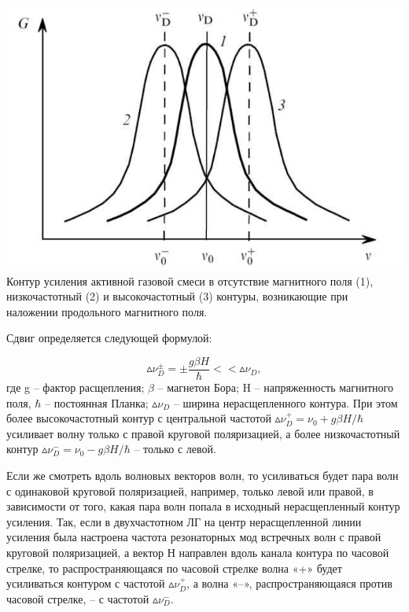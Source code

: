 \documentclass[a4paper,12pt]{article} %
\begin{document}
\begin{center}
    \includegraphics[scale=0.7]{pic8}\\
    \caption{Контур усиления активной газовой смеси в отсутствие магнитного
поля (1), низкочастотный (2) и высокочастотный (3) контуры, возникающие
при наложении продольного магнитного поля.}
\end{center}

Сдвиг определяется следующей формулой:

\begin{equation*}
    \vartriangle \! \! \nu^\pm_D = \pm \frac{g \beta H} {\hbar} << \vartriangle 
    \!\! \nu_D,
\end{equation*}
где g -- фактор расщепления; $\beta$ -- магнетон Бора; H -- напряженность магнитного поля, $\hbar$ -- постоянная Планка; $\vartriangle \! \! \nu_D$ -- ширина нерасщепленного контура. При этом более высокочастотный контур с центральной частотой $\vartriangle \! \! \nu^+_D = \nu_0 + g \beta H / \hbar$ усиливает волну только с правой круговой поляризацией, а более низкочастотный контур $\vartriangle \! \! \nu^-_D = \nu_0 - g \beta H / \hbar$ -- только с левой.

Если же смотреть вдоль волновых векторов волн, то усиливаться будет пара волн с одинаковой круговой поляризацией, например, только левой или правой, в зависимости от того, какая пара волн попала в исходный нерасщепленный контур усиления. Так, если в двухчастотном ЛГ на центр нерасщепленной
линии усиления была настроена частота резонаторных мод встречных волн с
правой круговой поляризацией, а вектор Н направлен вдоль канала контура по
часовой стрелке, то распространяющаяся по часовой стрелке волна «+» будет усиливаться контуром с частотой $\vartriangle \! \! \nu^+_D$, а волна «–», распространяющаяся против часовой стрелке, – с частотой $\vartriangle \! \! \nu^-_D$.
\end{document}
